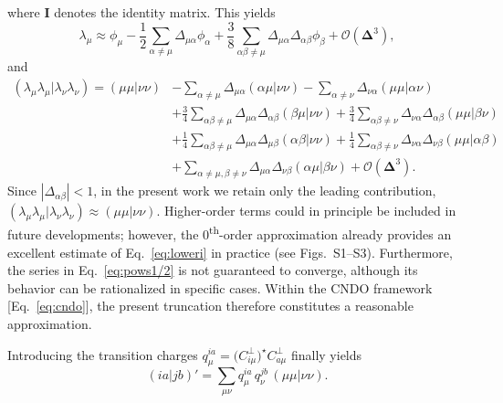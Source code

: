 \documentclass[%
 aip,
 amsmath,amssymb,
preprint,%
]{revtex4-2}
\begin{document}
where $\mathbf I$ denotes the identity matrix.  
This yields\begin{equation*}
	\lambda_\mu \approx \phi_{\mu} - \frac{1}{2}\sum_{\alpha\neq\mu} \Delta_{\mu\alpha}\phi_\alpha + \frac{3}{8}\sum_{\alpha\beta\neq\mu}  \Delta_{\mu\alpha}\Delta_{\alpha\beta}\phi_\beta + \mathcal{O}(\bm\Delta^3),
\end{equation*}
and
\begin{align*}
	(\lambda_\mu\lambda_\mu|\lambda_\nu\lambda_\nu)  = (\mu\mu|\nu\nu) &-\sum_{\alpha\neq\mu} \Delta_{\mu\alpha} (\alpha\mu|\nu\nu) -\sum_{\alpha\neq\nu} \Delta_{\nu\alpha} (\mu\mu|\alpha\nu)\\
	&+\frac{3}{4}\sum_{\alpha\beta\neq \mu} \Delta_{\mu\alpha}\Delta_{\alpha\beta} (\beta\mu|\nu\nu)+\frac{3}{4}\sum_{\alpha\beta\neq \nu} \Delta_{\nu\alpha}\Delta_{\alpha\beta} (\mu\mu|\beta\nu) \\
	&+\frac{1}{4}\sum_{\alpha\beta\neq \mu} \Delta_{\mu\alpha}\Delta_{\mu\beta} (\alpha\beta|\nu\nu)+\frac{1}{4}\sum_{\alpha\beta\neq \nu} \Delta_{\nu\alpha}\Delta_{\nu\beta} (\mu\mu|\alpha\beta) \\
	&+\sum_{\alpha\neq\mu,\beta\neq\nu} \Delta_{\mu\alpha}\Delta_{\nu\beta} (\alpha\mu|\beta\nu) + \mathcal{O}(\bm\Delta^3).
\end{align*}
Since $\left| \Delta_{\alpha\beta} \right| <1$, in the present work we retain only the leading contribution, $(\lambda_\mu\lambda_\mu|\lambda_\nu\lambda_\nu) \approx (\mu\mu|\nu\nu)$.  
Higher-order terms could in principle be included in future developments; however, the 0\textsuperscript{th}-order approximation already provides an excellent estimate of Eq.~\eqref{eq:loweri} in practice (see Figs.~S1--S3).  
Furthermore, the series in Eq.~\eqref{eq:pows1/2} is not guaranteed to converge, although its behavior can be rationalized in specific cases.\cite{chandlerReexaminationJustificationNeglect1980}  
Within the CNDO framework [Eq.~\eqref{eq:cndo}], the present truncation therefore constitutes a reasonable approximation.

Introducing the transition charges $q^{ia}_\mu = \big(C^{\perp}_{i\mu}\big)^\star C^{\perp}_{a\mu}$ finally yields
\begin{equation}
	(ia|jb)' = \sum_{\mu\nu} q^{ia}_\mu\,q^{jb}_\nu\,(\mu\mu|\nu\nu).
	\label{eq:xsints}
\end{equation}
\end{document}
